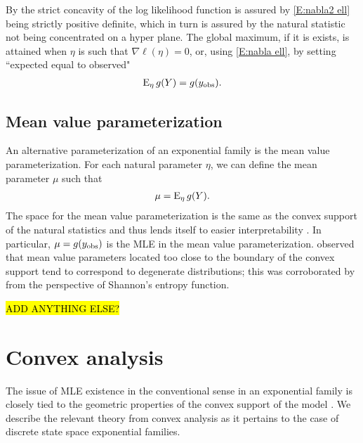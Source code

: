 By the strict concavity of the log likelihood function is assured by \eqref{E:nabla2 
ell} being strictly positive definite, which in turn is assured by the natural statistic
not being concentrated on a hyper plane.  The global 
maximum, if it is exists, is attained when $\eta$ is such that $\nabla \ell( \eta ) = 
0$, or, using \eqref{E:nabla ell}, by setting ``expected equal to observed"
\begin{align}
	\operatorname{E}_\eta g(Y) = g(y_{\text{obs}}). \label{E:Observed-Expected}
\end{align}



\subsection{Mean value parameterization}

An alternative parameterization of an exponential family is the mean value 
parameterization.  For each natural parameter $\eta$, we can define the mean parameter 
$\mu$ such that
\begin{align*}
	\mu = \operatorname{E}_\eta g(Y).
\end{align*}
The space for the mean value parameterization is the same as the convex support of the 
natural statistics and thus lends itself to easier interpretability  \citep
{Handcock:degeneracy, Rinaldo:2009}.  In particular, $\mu = g(y_{\text{obs}})$ is the MLE in 
the mean value parameterization.  \citeauthor{Handcock:degeneracy} observed that mean 
value parameters located too close to the boundary of the convex support tend to 
correspond to degenerate distributions; this was corroborated by 
\citeauthor{Rinaldo:2009} from the perspective of Shannon's entropy function.

\hl{ADD ANYTHING ELSE?}



\section{Convex analysis} \label{S:Convex analysis}
The issue of MLE existence in the conventional sense in an exponential family is 
closely tied to the geometric properties of 
the convex support of the model \citep{Barndorff, Geyer:gdor, Rinaldo:2009}.  We 
describe the relevant theory from convex analysis as it pertains to the case of 
discrete state space exponential families.

